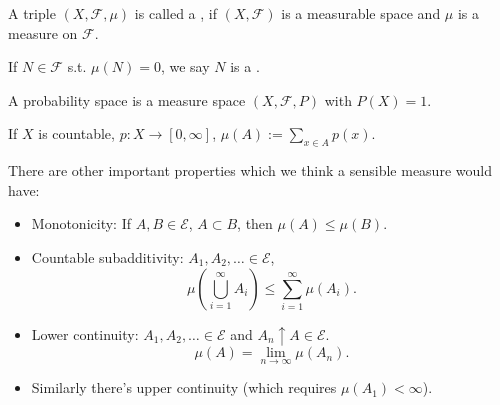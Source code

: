 \begin{definition}
	A triple $(X,\mathscr{F},\mu)$ is called a ,
	if $(X,\mathscr{F})$ is a measurable space and $\mu$ is a measure on $ \mathscr{F}$.
\end{definition}

If $N\in \mathscr{F}$ s.t. $\mu(N)=0$, we say  $N$ is a .

A probability space is a measure space $(X,\mathscr{F},P)$ with $P(X)=1$. 

\begin{example}
	If $X$ is countable,  $p:X\to [0,\infty]$, $\mu(A) := \sum_{x\in A} p(x)$.
\end{example}

There are other important properties which we think a sensible measure would have:
\begin{itemize}
	\item Monotonicity: If $A,B\in \mathscr{E}$, $A \subset B$, then $\mu(A)\le \mu(B)$. 

	\item Countable subadditivity: $A_1,A_2,\dots\in \mathscr{E}$,
	\[
	\mu \left( \bigcup_{i=1}^\infty A_i \right)\le \sum_{i=1}^{\infty} \mu(A_i).
	\]

	\item Lower continuity: $A_1,A_2,\dots\in \mathscr{E}$ and $A_n \uparrow A\in \mathscr{E}$.
	\[
	\mu(A) = \lim_{n\to \infty}\mu(A_n).
	\]

	\item Similarly there's upper continuity (which requires $\mu(A_1)<\infty$).
\end{itemize}


